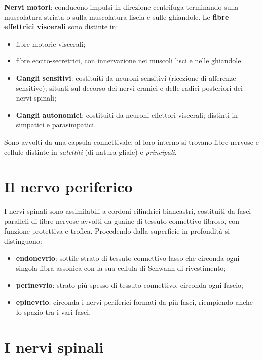 \textbf{Nervi motori}: conducono impulsi in direzione centrifuga terminando
sulla muscolatura striata o sulla muscolatura liscia e sulle ghiandole. Le
\textbf{fibre effettrici viscerali} sono distinte in:
\begin{itemize}
  \item fibre motorie viscerali;
  \item fibre eccito-secretrici, con innervazione nei muscoli lisci e nelle
    ghiandole.
\end{itemize}

\begin{itemize}
  \item \textbf{Gangli sensitivi}: costituiti da neuroni sensitivi (ricezione
    di afferenze sensitive); situati sul decorso dei nervi cranici e delle
    radici posteriori dei nervi spinali;
  \item \textbf{Gangli autonomici}: costituiti da neuroni effettori
    viscerali; distinti in simpatici e parasimpatici.
\end{itemize}
Sono avvolti da una capsula connettivale; al loro interno si trovano fibre
nervose e cellule distinte in \textit{satelliti} (di natura gliale) e
\textit{principali}.

\section{Il nervo periferico}

I nervi spinali sono assimilabili a cordoni cilindrici biancastri,
costituiti da fasci paralleli di fibre nervose avvolti da guaine di tessuto
connettivo fibroso, con funzione protettiva e trofica. Procedendo dalla
superficie in profondità si distinguono:
\begin{itemize}
  \item \textbf{endonevrio}: sottile strato di tessuto connettivo lasso che
    circonda ogni singola fibra assonica con la sua cellula di Schwann di
    rivestimento;
  \item \textbf{perinevrio}: strato più spesso di tessuto connettivo, circonda
    ogni fascio;
  \item \textbf{epinevrio}: circonda i nervi periferici formati da più fasci,
    riempiendo anche lo spazio tra i vari fasci.
\end{itemize}

\section{I nervi spinali}

